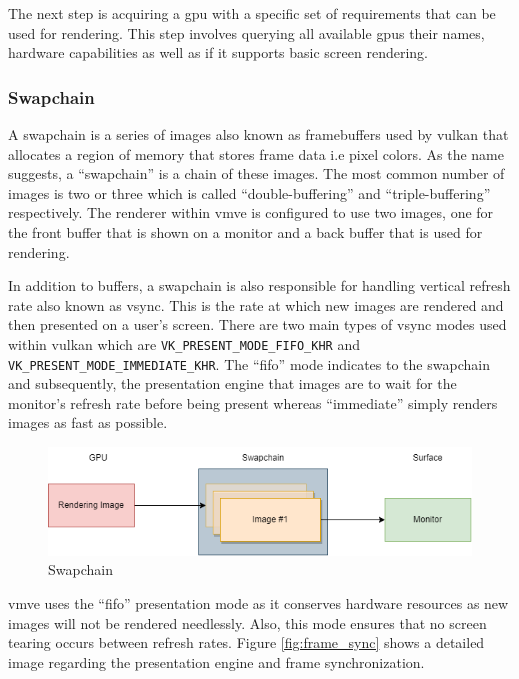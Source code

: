 \documentclass[11pt]{article}
\begin{document}
The next step is acquiring a \gls*{gpu} with a specific set of requirements that
can be used for rendering. This step involves querying all available \glspl*{gpu}
their names, hardware capabilities as well as if it supports basic screen
rendering.

\subsubsection{Swapchain}
A swapchain is a series of images also known as framebuffers used by
\gls*{vulkan} that allocates a region of memory that stores frame data i.e pixel
colors. As the name suggests, a ``swapchain'' is a chain of these images. The
most common number of images is two or three which is called
``double-buffering'' and ``triple-buffering'' respectively. The renderer within
\gls*{vmve} is configured to use two images, one for the front buffer that is shown
on a monitor and a back buffer that is used for rendering.

In addition to buffers, a swapchain is also responsible for handling vertical
refresh rate also known as vsync. This is the rate at which new images are
rendered and then presented on a user's screen. There are two main types of
vsync modes used within \gls*{vulkan} which are
\lstinline{VK_PRESENT_MODE_FIFO_KHR} and
\lstinline{VK_PRESENT_MODE_IMMEDIATE_KHR}. The ``fifo'' mode indicates to the 
swapchain and subsequently, the presentation engine that images are to wait 
for the monitor's refresh rate before being present whereas ``immediate'' simply
renders images as fast as possible.

\begin{figure}[H]
  \centering
  \includegraphics[width=\textwidth]{images/swapchain.png}
  \caption{Swapchain}
  \label{fig:swapchain}
\end{figure}

\gls*{vmve} uses the ``fifo'' presentation mode as it conserves hardware
resources as new images will not be rendered needlessly. Also, this mode ensures
that no screen tearing occurs between refresh rates. Figure \ref{fig:frame_sync}
shows a detailed image regarding the presentation engine and frame
synchronization.
\end{document}
